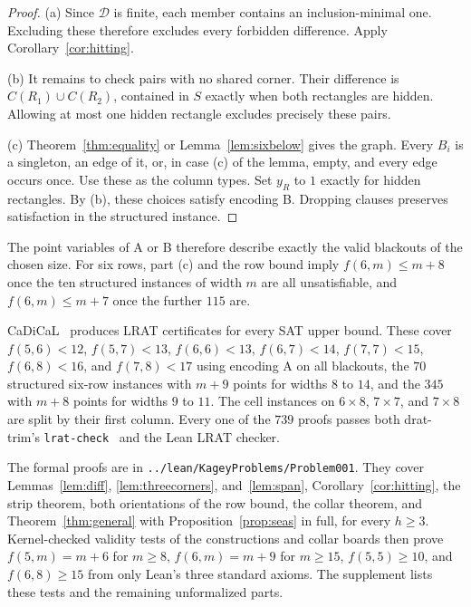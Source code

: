 \begin{proof}
(a) Since $\mathcal D$ is finite, each member contains an inclusion-minimal
one. Excluding these therefore excludes every forbidden difference.
Apply Corollary~\ref{cor:hitting}.

(b) It remains to check pairs with no shared corner. Their difference is
$C(R_1)\cup C(R_2)$, contained in $S$ exactly when both rectangles are
hidden. Allowing at most one hidden rectangle excludes precisely these pairs.

(c) Theorem~\ref{thm:equality} or Lemma~\ref{lem:sixbelow} gives the graph.
Every $B_i$ is a singleton, an edge of it, or, in case (c) of the lemma, empty, and every
edge occurs once. Use these as the column types. Set $y_R$ to $1$ exactly
for hidden rectangles. By (b), these choices satisfy encoding B.
Dropping clauses preserves satisfaction in the structured instance.
\end{proof}

The point variables of A or B therefore describe exactly the valid
blackouts of the chosen size. For six rows, part (c) and the
row bound imply $f(6,m)\le m+8$ once the ten structured instances of
width $m$ are all unsatisfiable, and $f(6,m)\le m+7$ once the further $115$ are.

CaDiCaL~\cite{biere2024} produces LRAT certificates for every SAT upper bound.
These cover
$f(5,6)<12$, $f(5,7)<13$, $f(6,6)<13$, $f(6,7)<14$, $f(7,7)<15$,
$f(6,8)<16$, and $f(7,8)<17$ using encoding A on all blackouts, the $70$ structured six-row
instances with $m+9$ points for widths $8$ to $14$, and the $345$ with $m+8$ points for
widths $9$ to $11$. The cell instances on $6\times8$, $7\times7$, and $7\times8$ are split by
their first column. Every one of the $739$ proofs passes both drat-trim's
\texttt{lrat-check}~\cite{cruzfilipe2017,wetzler2014} and the Lean LRAT checker.

The formal proofs are in \nolinkurl{../lean/KageyProblems/Problem001}.
They cover Lemmas~\ref{lem:diff}, \ref{lem:threecorners}, and~\ref{lem:span},
Corollary~\ref{cor:hitting}, the strip theorem, both orientations of
the row bound, the collar theorem, and Theorem~\ref{thm:general} with
Proposition~\ref{prop:seas} in full, for every $h\ge3$. Kernel-checked validity tests of the constructions
and collar boards then prove $f(5,m)=m+6$ for $m\ge8$, $f(6,m)=m+9$ for
$m\ge15$, $f(5,5)\ge10$, and $f(6,8)\ge15$ from only Lean's three
standard axioms. The supplement lists these tests and the remaining unformalized parts.

